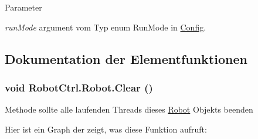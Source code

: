 \begin{DoxyParams}{Parameter}
\item[{\em runMode}]argument vom Typ enum RunMode in \hyperlink{class_robot_ctrl_1_1_config}{Config}. \end{DoxyParams}


\subsection{Dokumentation der Elementfunktionen}
\hypertarget{class_robot_ctrl_1_1_robot_afb01a74bfcb74eab60f041a368f93737}{
\subsubsection[{Clear}]{\setlength{\rightskip}{0pt plus 5cm}void RobotCtrl.Robot.Clear ()}}
\label{class_robot_ctrl_1_1_robot_afb01a74bfcb74eab60f041a368f93737}
Methode sollte alle laufenden Threads dieses \hyperlink{class_robot_ctrl_1_1_robot}{Robot} Objekts beenden 

Hier ist ein Graph der zeigt, was diese Funktion aufruft:



